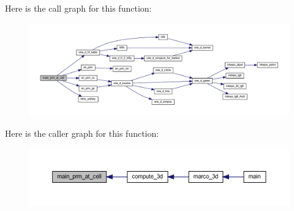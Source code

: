 Here is the call graph for this function\+:
\nopagebreak
\begin{figure}[H]
\begin{center}
\leavevmode
\includegraphics[width=350pt]{Marco_8f90_a81389ef2893dbfd5d6a4c769758b1336_cgraph}
\end{center}
\end{figure}
Here is the caller graph for this function\+:
\nopagebreak
\begin{figure}[H]
\begin{center}
\leavevmode
\includegraphics[width=350pt]{Marco_8f90_a81389ef2893dbfd5d6a4c769758b1336_icgraph}
\end{center}
\end{figure}
\mbox{\label{Marco_8f90_adfc6a7cb71bd4ea9c02eaafd4d9e5664}} 
